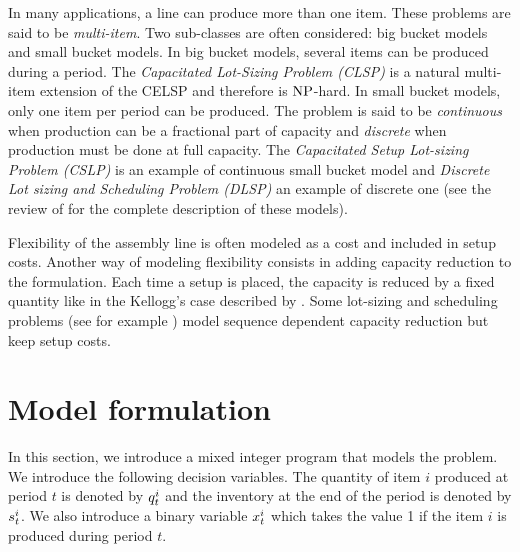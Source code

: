 In many applications, a line can produce more than one item.
These problems are said to be \emph{multi-item}.
Two sub-classes are often considered: big bucket models and small bucket models.
In big bucket models, several items can be produced during a period.
The \emph{Capacitated Lot-Sizing Problem (CLSP)} is a natural multi-item extension of the CELSP and therefore is $\operatorname{NP}$-hard.
In small bucket models, only one item per period can be produced.
The problem is said to be \emph{continuous} when production can be a fractional part of capacity and \emph{discrete} when production must be done at full capacity.
The \emph{Capacitated Setup Lot-sizing Problem (CSLP)} is an example of continuous small bucket model and \emph{Discrete Lot sizing and Scheduling Problem (DLSP)} an example of discrete one (see the review of \citet{Gicquel2008} for the complete description of these models).


Flexibility of the assembly line is often modeled as a cost and included in setup costs.
Another way of modeling flexibility consists in adding capacity reduction to the formulation.
Each time a setup is placed, the capacity is reduced by a fixed quantity like in the Kellogg's case described by \citet[Chapter 4]{Pochet2006}.
Some lot-sizing and scheduling problems (see for example \citet{Guimaraes2014}) model sequence dependent capacity reduction but keep setup costs.


\section{Model formulation}
\label{sec:PDP:deterministic:model}


In this section, we introduce a mixed integer program that models the problem.
We introduce the following decision variables.
The quantity of item $i$ produced at period $t$ is denoted by $q_t^i$ and the inventory at the end of the period is denoted by $s_t^i$.
We also introduce a binary variable $x_t^i$ which takes the value 1 if the item $i$ is produced during period $t$.


